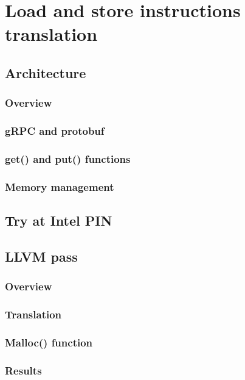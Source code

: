 \documentclass[bsc,frontabs,twoside,singlespacing,parskip,deptreport]{infthesis}     %
\begin{document}
\chapter{Load and store instructions translation}

\section{Architecture}

\subsection{Overview}

\subsection{gRPC and protobuf}

\subsection{get() and put() functions}

\subsection{Memory management}

\section{Try at Intel PIN}

\section{LLVM pass}

\subsection{Overview}

\subsection{Translation}

\subsection{Malloc() function}

\subsection{Results}
\end{document}
